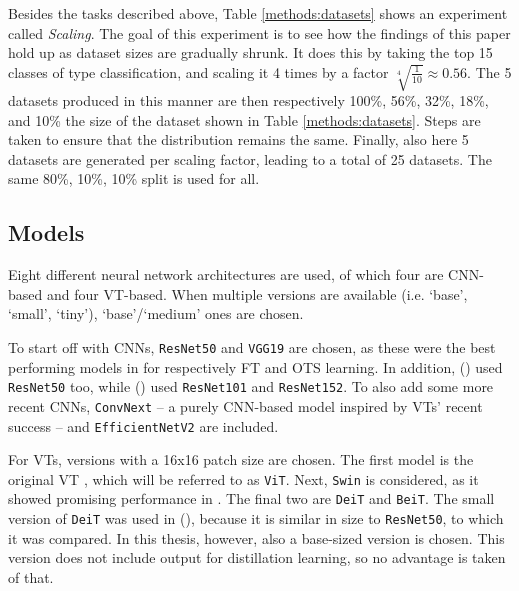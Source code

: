 Besides the tasks described above, Table \ref{methods:datasets} shows an experiment called \textit{Scaling}. The goal of this experiment is to see how the findings of this paper hold up as dataset sizes are gradually shrunk. It does this by taking the top 15 classes of type classification, and scaling it 4 times by a factor $\sqrt[4]{\frac{1}{10}} \approx 0.56$. The 5 datasets produced in this manner are then respectively 100\%, 56\%, 32\%, 18\%, and 10\% the size of the dataset shown in Table \ref{methods:datasets}. Steps are taken to ensure that the distribution remains the same. Finally, also here 5 datasets are generated per scaling factor, leading to a total of 25 datasets. The same 80\%, 10\%, 10\% split is used for all.


\subsection{Models} \label{methods:models}
Eight different neural network architectures are used, of which four are CNN-based and four VT-based. When multiple versions are available (i.e. `base', `small', `tiny'), `base'/`medium' ones are chosen.

To start off with CNNs, \texttt{ResNet50} \citep{he2016deep} and \texttt{VGG19} \citep{simonyan2014very} are chosen, as these were the best performing models in \citeauthor{sabatelli2018deep} for respectively FT and OTS learning. In addition, \citeauthor{matsoukas2021time} (\citeyear{matsoukas2021time}) used \texttt{ResNet50} too, while \citeauthor{zhou2021convnets} (\citeyear{zhou2021convnets}) used \texttt{ResNet101} and \texttt{ResNet152}. To also add some more recent CNNs, \texttt{ConvNext} \citep{liu2022convnet} -- a purely CNN-based model inspired by VTs' recent success -- and \texttt{EfficientNetV2} \citep{tan2021efficientnetv2} are included.

For VTs, versions with a 16x16 patch size are chosen. The first model is the original VT \citep{dosovitskiy2020image}, which will be referred to as \texttt{ViT}. Next, \texttt{Swin} \citep{liu2021swin} is considered, as it showed promising performance in \citeauthor{zhou2021convnets}. The final two are \texttt{DeiT} and \texttt{BeiT}. The small version of \texttt{DeiT} was used in \citeauthor{matsoukas2021time} (\citeyear{matsoukas2021time}), because it is similar in size to \texttt{ResNet50}, to which it was compared. In this thesis, however, also a base-sized version is chosen. This version does not include output for distillation learning, so no advantage is taken of that.

